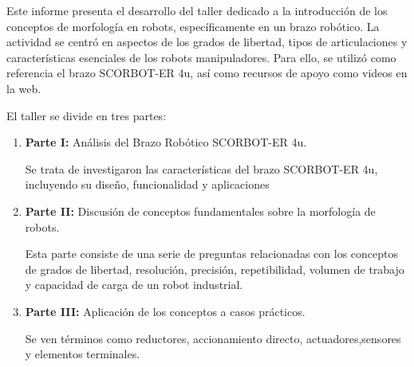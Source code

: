 Este informe presenta el desarrollo del taller dedicado a la introducción de los conceptos de morfología en robots, específicamente en un brazo robótico. La actividad se centró en aspectos de los grados de libertad, tipos de articulaciones y características esenciales de los robots manipuladores. Para ello, se utilizó como referencia el brazo SCORBOT-ER 4u, así como recursos de apoyo como videos en la web.  

El taller se divide en tres partes:

\begin{enumerate}
    \item \textbf{Parte I:} Análisis del Brazo Robótico SCORBOT-ER 4u.
    
    Se trata de investigaron las características del brazo SCORBOT-ER 4u, incluyendo su diseño, funcionalidad y aplicaciones

    \item \textbf{Parte II:} Discusión de conceptos fundamentales sobre la morfología de robots.

    Esta parte consiste de una serie de preguntas relacionadas con los conceptos de grados de libertad, resolución, precisión, repetibilidad, volumen de trabajo y capacidad de carga de un robot industrial. 

    \item \textbf{Parte III:} Aplicación de los conceptos a casos prácticos.
    
    Se ven términos como reductores, accionamiento directo, actuadores,sensores y elementos terminales.
  
\end{enumerate}